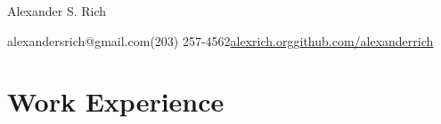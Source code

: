 \documentclass[10pt]{my_cv}
\begin{document}
{\Large Alexander S. Rich}
\begin{addmargin}[1em]{0em}
alexandersrich@gmail.com\hspace{1em}\textbar\hspace{1em}(203)
257-4562\hspace{1em}\textbar\hspace{1em}\href{http://www.alexrich.org}{alexrich.org}\hspace{1em}\textbar\hspace{1em}\href{http://www.github.com/alexanderrich}{github.com/alexanderrich}
\end{addmargin}


\section{Work Experience}

\hrulefill
\end{document}
